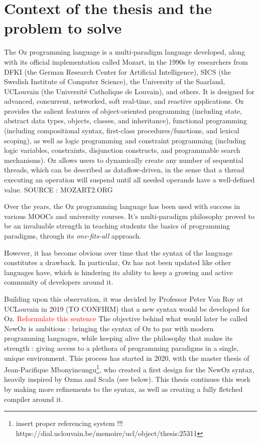 
\section{Context of the thesis and the problem to solve}\label{sec:ch1-1}
The Oz programming language is a multi-paradigm language developed, along with its official implementation called Mozart, in the 1990s by researchers from DFKI (the German Research Center for Artificial Intelligence), SICS (the Swedish Institute of Computer Science), the University of the Saarland, UCLouvain (the Université Catholique de Louvain), and others.
It is designed for advanced, concurrent, networked, soft real-time, and reactive applications.
Oz provides the salient features of object-oriented programming (including state, abstract data types, objects, classes, and inheritance),
functional programming (including compositional syntax, first-class procedures/functions, and lexical scoping), as well as
logic programming and constraint programming (including logic variables, constraints, disjunction constructs, and programmable search mechanisms).
Oz allows users to dynamically create any number of sequential threads, which can be described as dataflow-driven, in the sense that a thread executing an operation will suspend until all needed operands have a well-defined value.
SOURCE : MOZART2.ORG

Over the years, the Oz programming language has been used with success in various MOOCs and university courses.
It's multi-paradigm philosophy proved to be an invaluable strength in teaching students the basics of programming paradigms, through its \textit{one-fits-all} approach.

However, it has become obvious over time that the syntax of the language constitutes a drawback.
In particular, Oz has not been updated like other languages have, which is hindering its ability to keep a growing and active community of developers around it.

Building upon this observation, it was decided by Professor Peter Van Roy at UCLouvain in 2019 (TO CONFIRM) that a new syntax would be developed for Oz. \textcolor{red}{Reformulate this sentence}
The objective behind what would later be called NewOz is ambitious : bringing the syntax of Oz to par with modern programming languages, while keeping alive the philosophy that makes its strength : giving access to a plethora of programming paradigms in a single, unique environment.
This process has started in 2020, with the master thesis of Jean-Pacifique Mbonyincungu\footnote{insert proper referencing system !!! https://dial.uclouvain.be/memoire/ucl/object/thesis:25311}, who created a first design for the NewOz syntax, heavily inspired by Ozma and Scala (see below).
This thesis continues this work by making more refinements to the syntax, as well as creating a fully fletched compiler around it.

